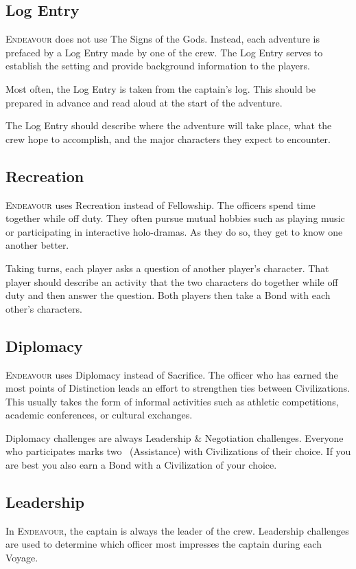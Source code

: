 \documentclass[11pt, a5paper, parskip=half-, DIV=12]{scrartcl}
\newcommand{\ENDEAVOUR}{\textsc{Endeavour}}%
\begin{document}
\subsection*{Log Entry}
\ENDEAVOUR{} does not use The Signs of the Gods. Instead, each adventure is prefaced by a Log Entry made by one of the crew. The Log Entry serves to establish the setting and provide background information to the players.

Most often, the Log Entry is taken from the captain's log.  This should be prepared in advance and read aloud at the start of the adventure.

The Log Entry should describe where the adventure will take place, what the crew hope to accomplish, and the major characters they expect to encounter.

\newpage

\subsection*{Recreation}
\ENDEAVOUR{} uses Recreation instead of Fellowship. The officers spend time together while off duty. They often pursue mutual hobbies such as playing music or participating in interactive holo-dramas. As they do so, they get to know one another better. 

Taking turns, each player asks a question of another player's character. That player should describe an activity that the two characters do together while off duty and then answer the question. Both players then take a Bond with each other's characters. 

\subsection*{Diplomacy}
\ENDEAVOUR{} uses Diplomacy instead of Sacrifice. The officer who has earned the most points of Distinction leads an effort to strengthen ties between Civilizations. This usually takes the form of informal activities such as athletic competitions, academic conferences, or cultural exchanges.

Diplomacy challenges are always Leadership \& Negotiation challenges.  Everyone who participates marks two ~(Assistance) with Civilizations of their choice. If you are best you also earn a Bond with a Civilization of your choice.

\subsection*{Leadership}
In \ENDEAVOUR{}, the captain is always the leader of the crew. Leadership challenges are used to determine which officer most impresses the captain during each Voyage.
\end{document}
